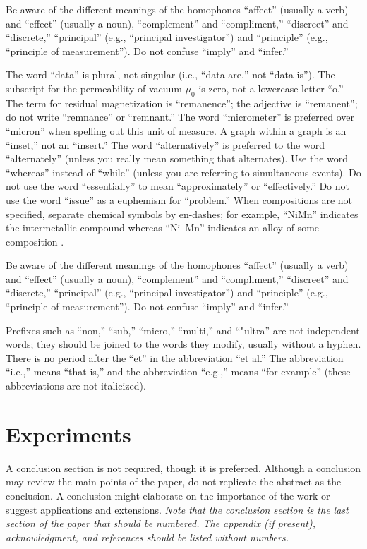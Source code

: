 \documentclass[conf]{new-aiaa}
\begin{document}
Be aware of the different meanings of the homophones ``affect'' (usually a verb) and ``effect'' (usually a noun), ``complement'' and ``compliment,'' ``discreet'' and ``discrete,'' ``principal'' (e.g., ``principal investigator'') and ``principle'' (e.g., ``principle of measurement''). Do not confuse ``imply'' and ``infer.''

The word ``data'' is plural, not singular (i.e., ``data are,'' not ``data is''). The subscript for the permeability of vacuum $\mu_0$ is zero, not a lowercase letter ``o.'' The term for residual magnetization is ``remanence''; the adjective is ``remanent''; do not write ``remnance'' or ``remnant.'' The word ``micrometer'' is preferred over ``micron'' when spelling out this unit of measure. A graph within a graph is an ``inset,'' not an ``insert.'' The word ``alternatively'' is preferred to the word ``alternately'' (unless you really mean something that alternates). Use the word ``whereas'' instead of ``while'' (unless you are referring to simultaneous events). Do not use the word ``essentially'' to mean ``approximately'' or ``effectively.'' Do not use the word ``issue'' as a euphemism for ``problem.'' When compositions are not specified, separate chemical symbols by en-dashes; for example, ``NiMn'' indicates the intermetallic compound  whereas ``Ni--Mn'' indicates an alloy of some composition .

Be aware of the different meanings of the homophones ``affect'' (usually a verb) and ``effect'' (usually a noun), ``complement'' and ``compliment,'' ``discreet'' and ``discrete,'' ``principal'' (e.g., ``principal investigator'') and ``principle'' (e.g., ``principle of measurement''). Do not confuse ``imply'' and ``infer.''

Prefixes such as ``non,'' ``sub,'' ``micro,'' ``multi,'' and ``"ultra'' are not independent words; they should be joined to the words they modify, usually without a hyphen. There is no period after the ``et'' in the abbreviation ``et al.'' The abbreviation ``i.e.,'' means ``that is,'' and the abbreviation ``e.g.,'' means ``for example'' (these abbreviations are not italicized).




\section{Experiments}
A conclusion section is not required, though it is preferred. Although a conclusion may review the main points of the paper, do not replicate the abstract as the conclusion. A conclusion might elaborate on the importance of the work or suggest applications and extensions. \textit{Note that the conclusion section is the last section of the paper that should be numbered. The appendix (if present), acknowledgment, and references should be listed without numbers.}
\end{document}
